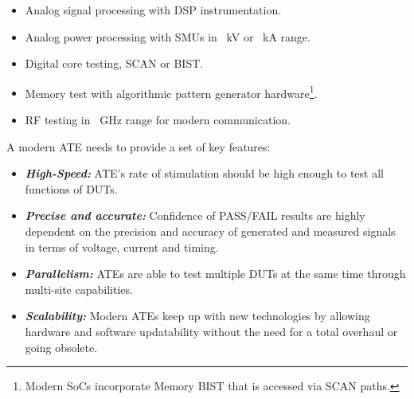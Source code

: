 \begin{itemize}[topsep=8pt,itemsep=4pt,partopsep=4pt, parsep=4pt]
    \item Analog signal processing with \ac{DSP} instrumentation.
    \item Analog power processing with \ac{SMU}s in
    \SI{}{\kilo\volt} or \SI{}{\kilo\ampere} range.
    \item Digital core testing, SCAN or \ac{BIST}.
    \item Memory test with algorithmic pattern generator hardware\footnote{
        Modern SoCs incorporate Memory BIST that is accessed via SCAN paths.}.
    \item \ac{RF} testing in \SI{}{\giga\hertz} range for modern communication.
\end{itemize}

A modern \ac{ATE} needs to provide a set of key features:

\begin{itemize}[topsep=8pt,itemsep=4pt,partopsep=4pt, parsep=4pt]

    \item \textbf{\emph{High-Speed:}} \ac{ATE}'s rate of stimulation
    should be high enough to test all functions of \acp{DUT}.

    \item \textbf{\emph{Precise and accurate:}} Confidence of PASS/FAIL results
    are highly dependent on the precision and accuracy of generated
    and measured signals in terms of voltage, current and timing.

    \item \textbf{\emph{Parallelism:}} \acp{ATE} are able to
    test multiple \acp{DUT} at the same time through multi-site capabilities.

    \item \textbf{\emph{Scalability:}} Modern \acp{ATE}
    keep up with new technologies by allowing hardware and
    software updatability without the need for a total overhaul or going
    obsolete.

\end{itemize}



